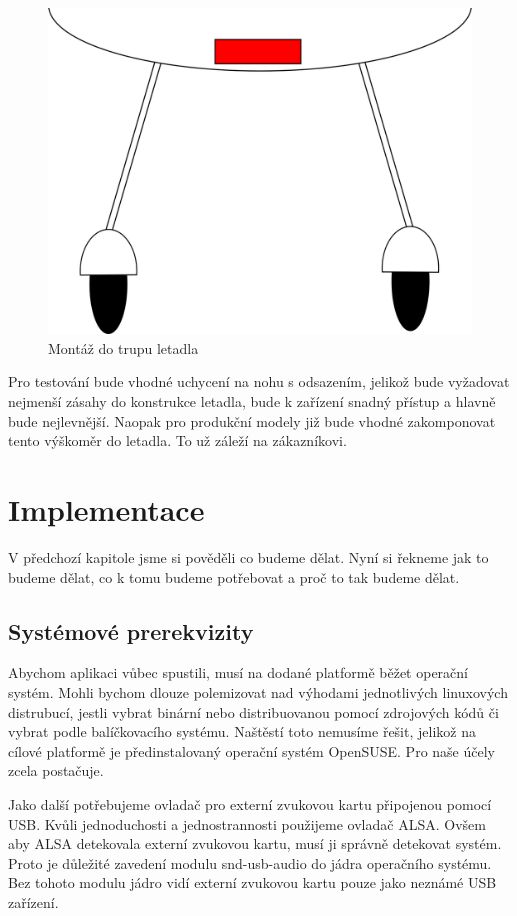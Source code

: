 \begin{itemize}
			\begin{figure}[H]
				\begin{center}
					\includegraphics[scale=0.5]{obrazky-figures/umisteni_v_trupu.png}
					\caption{Montáž do trupu letadla}
					\label{navrh::umisteniuvnitr}
				\end{center}
			\end{figure}
			
		\end{itemize} 
		
		Pro testování bude vhodné uchycení na nohu s odsazením, jelikož bude vyžadovat nejmenší zásahy do konstrukce letadla, bude k zařízení snadný přístup a hlavně bude nejlevnější.
		Naopak pro produkční modely již bude vhodné zakomponovat tento výškoměr do letadla. To už záleží na zákazníkovi.
		
\chapter{Implementace}
	V předchozí kapitole jsme si pověděli co budeme dělat. Nyní si řekneme jak to budeme dělat, co k tomu budeme potřebovat a proč to tak budeme dělat.\par
	
	\section{Systémové prerekvizity}
	Abychom aplikaci vůbec spustili, musí na dodané platformě běžet operační systém. Mohli bychom dlouze polemizovat nad výhodami jednotlivých linuxových distrubucí, jestli vybrat binární nebo distribuovanou pomocí zdrojových kódů či vybrat podle balíčkovacího systému. Naštěstí toto nemusíme řešit, jelikož na cílové platformě je předinstalovaný operační systém OpenSUSE. Pro naše účely zcela postačuje.\par
	Jako další potřebujeme ovladač pro externí zvukovou kartu připojenou pomocí USB. Kvůli jednoduchosti a jednostrannosti použijeme ovladač ALSA. Ovšem aby ALSA detekovala externí zvukovou kartu, musí ji správně detekovat systém. Proto je důležité zavedení modulu snd-usb-audio do jádra operačního systému. Bez tohoto modulu jádro vidí externí zvukovou kartu pouze jako neznámé USB zařízení.\par
	
